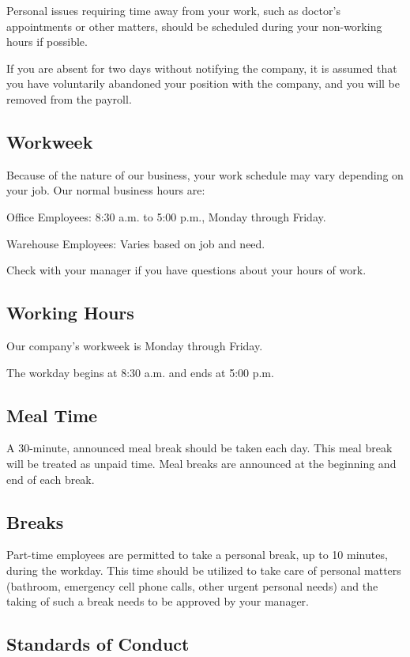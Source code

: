 \documentclass{book}
\begin{document}
Personal issues requiring time away from your work, such as doctor's appointments or other matters, should be scheduled during your non-working hours if possible.

If you are absent for two days without notifying the company, it is assumed that you have voluntarily abandoned your position with the company, and you will be removed from the payroll.

\subsection{Workweek}

Because of the nature of our business, your work schedule may vary depending on your job. Our normal business hours are:

Office Employees: 8:30 a.m. to 5:00 p.m., Monday through Friday.

Warehouse Employees: Varies based on job and need.

Check with your manager if you have questions about your hours of work.

\subsection{Working Hours}

Our company's workweek is Monday through Friday.

The workday begins at 8:30 a.m. and ends at 5:00 p.m.

\subsection{Meal Time}

A 30-minute, announced meal break should be taken each day. This meal break will be treated as unpaid time. Meal breaks are announced at the beginning and end of each break.

\subsection{Breaks}

Part-time employees are permitted to take a personal break, up to 10 minutes, during the workday. This time should be utilized to take care of personal matters (bathroom, emergency cell phone calls, other urgent personal needs) and the taking of such a break needs to be approved by your manager.

\subsection{Standards of Conduct}
\end{document}

